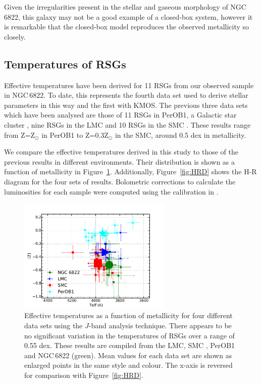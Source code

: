 Given the irregularities present in the stellar and gaseous morphology of NGC\,6822, this galaxy may not be a good example of a closed-box system, however it is remarkable that the closed-box model reproduces the observed metallicity so closely.


\subsection{Temperatures of RSGs} %
\label{sub:temperatures_of_rsgs}

Effective temperatures have been derived for 11 RSGs from our observed sample in NGC\,6822.
To date, this represents the fourth data set used to derive stellar parameters in this way and the first with KMOS.
The previous three data sets which have been analysed are those of 11 RSGs in PerOB1,
a Galactic star cluster
\citep{2014ApJ...788...58G}, nine RSGs in the LMC and 10 RSGs in the SMC
\citep[both from][]{Davies-prep}.
These results range from Z=Z$_{\odot}$ in PerOB1 to Z=0.3Z$_{\odot}$ in the SMC, around 0.5 dex in metallicity.

We compare the effective temperatures derived in this study to those of the previous results in different environments.
Their distribution is shown as a function of metallicity in Figure~\ref{fig:TvsZ}.
Additionally, Figure~\ref{fig:HRD} shows the H-R diagram for the four sets of results.
Bolometric corrections to calculate the luminosities for each sample were computed using the calibration in
\cite{2013ApJ...767....3D}.


\begin{figure}
 \centering
\includegraphics[width=0.65\textwidth]{ngc6822/N6822_TeffvsZ_all}
\caption{
Effective temperatures as a function of metallicity for four different data sets using the $J$-band analysis technique.
There appears to be no significant variation in the temperatures of RSGs over a range of 0.55 dex.
These results are compiled from the LMC, SMC
\protect\citep[blue and red points respectively;][]{Davies-prep}, PerOB1
\protect\citep[a Galactic RSG cluster; cyan;][]{2014ApJ...788...58G} and NGC\,6822 (green).
Mean values for each data set are shown as enlarged points in the same style and colour.
The x-axis is reversed for comparison with Figure~\ref{fig:HRD}.\label{fig:TvsZ}
         }
\end{figure}

